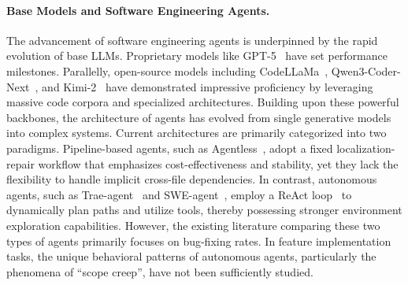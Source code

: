 \paragraph{\textbf{Base Models and Software Engineering Agents.}} The advancement of software engineering agents is underpinned by the rapid evolution of base LLMs. Proprietary models like GPT-5~\cite{gpt-5} have set performance milestones. Parallelly, open-source models including CodeLLaMa~\cite{roziere2023code}, Qwen3-Coder-Next~\cite{qwen3lmQwen3Coder}, and Kimi-2~\cite{team2025kimi} have demonstrated impressive proficiency by leveraging massive code corpora and specialized architectures. Building upon these powerful backbones, the architecture of agents has evolved from single generative models into complex systems. Current architectures are primarily categorized into two paradigms. Pipeline-based agents, such as Agentless~\cite{agentless}, adopt a fixed localization-repair workflow that emphasizes cost-effectiveness and stability, yet they lack the flexibility to handle implicit cross-file dependencies. In contrast, autonomous agents, such as Trae-agent~\cite{traeagent} and SWE-agent~\cite{yang2024swe}, employ a ReAct loop~\cite{yao2022react} to dynamically plan paths and utilize tools, thereby possessing stronger environment exploration capabilities. However, the existing literature comparing these two types of agents primarily focuses on bug-fixing rates. In feature implementation tasks, the unique behavioral patterns of autonomous agents, particularly the phenomena of ``scope creep'', have not been sufficiently studied.
